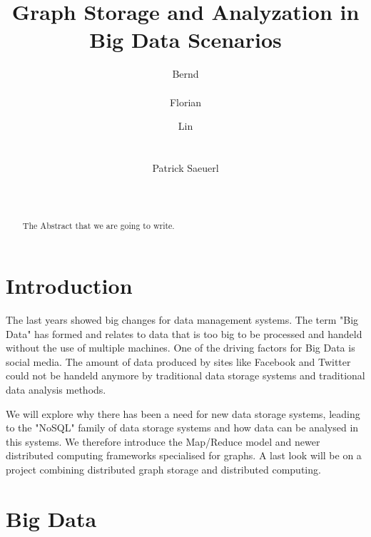 \documentclass{acm_proc_article-sp}
\begin{document}
\title{Graph Storage and Analyzation in Big Data Scenarios}

\author{
\alignauthor
Bernd\\
       \\
\alignauthor Florian
       \\
\and
\alignauthor Lin
       \\
       \\
       \\
\alignauthor Patrick Saeuerl\\
       \\
	   \\
}


\maketitle
\begin{abstract}
The Abstract that we are going to write.
\end{abstract}

\section{Introduction}

The last years showed big changes for data management systems. The term "Big Data" has formed and relates to data that is too big to be processed and handeld without the use of multiple machines.
One of the driving factors for Big Data is social media. The amount of data produced by sites like Facebook and Twitter could not be handeld anymore by traditional data storage systems and traditional data analysis methods.

We will explore why there has been a need for new data storage systems, leading to the "NoSQL" family of data storage systems and how data can be analysed in this systems. We therefore introduce the Map/Reduce model and newer distributed computing frameworks specialised for graphs. A last look will be on a project combining distributed graph storage and distributed computing.

\section{Big Data}
\end{document}
